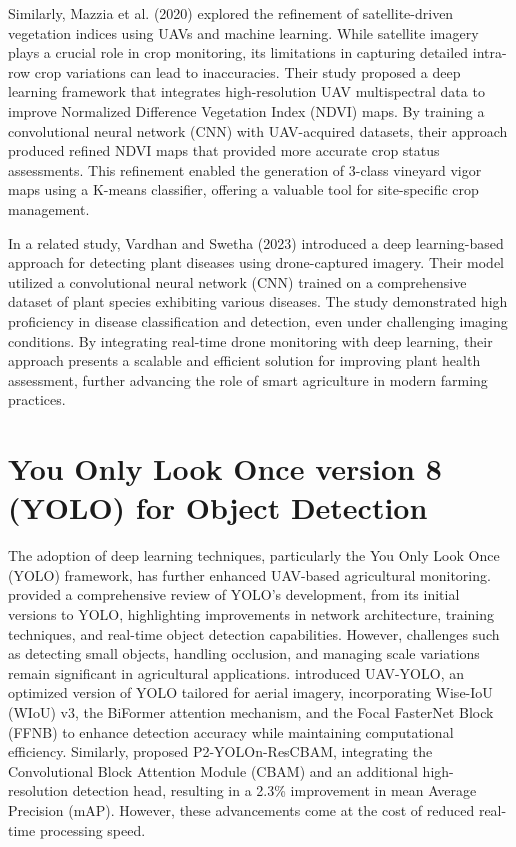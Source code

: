 Similarly, Mazzia et al. (2020) explored the refinement of satellite-driven vegetation indices using UAVs and machine learning. While satellite imagery plays a crucial role in crop monitoring, its limitations in capturing detailed intra-row crop variations can lead to inaccuracies. Their study proposed a deep learning framework that integrates high-resolution UAV multispectral data to improve Normalized Difference Vegetation Index (NDVI) maps. By training a convolutional neural network (CNN) with UAV-acquired datasets, their approach produced refined NDVI maps that provided more accurate crop status assessments. This refinement enabled the generation of 3-class vineyard vigor maps using a K-means classifier, offering a valuable tool for site-specific crop management.

In a related study, Vardhan and Swetha (2023) introduced a deep learning-based approach for detecting plant diseases using drone-captured imagery. Their model utilized a convolutional neural network (CNN) trained on a comprehensive dataset of plant species exhibiting various diseases. The study demonstrated high proficiency in disease classification and detection, even under challenging imaging conditions. By integrating real-time drone monitoring with deep learning, their approach presents a scalable and efficient solution for improving plant health assessment, further advancing the role of smart agriculture in modern farming practices.

\section{You Only Look Once version 8 (YOLO) for Object Detection}
The adoption of deep learning techniques, particularly the You Only Look Once (YOLO) framework, has further enhanced UAV-based agricultural monitoring. \cite{terven2023} provided a comprehensive review of YOLO’s development, from its initial versions to YOLO, highlighting improvements in network architecture, training techniques, and real-time object detection capabilities. However, challenges such as detecting small objects, handling occlusion, and managing scale variations remain significant in agricultural applications. \cite{wang2023} introduced UAV-YOLO, an optimized version of YOLO tailored for aerial imagery, incorporating Wise-IoU (WIoU) v3, the BiFormer attention mechanism, and the Focal FasterNet Block (FFNB) to enhance detection accuracy while maintaining computational efficiency. Similarly, \cite{zamri2024} proposed P2-YOLOn-ResCBAM, integrating the Convolutional Block Attention Module (CBAM) and an additional high-resolution detection head, resulting in a 2.3\% improvement in mean Average Precision (mAP). However, these advancements come at the cost of reduced real-time processing speed.

